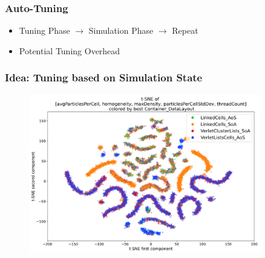 \documentclass[
	10pt,
	t		%
]{beamer}
\begin{document}
\begin{frame}
	\frametitle{Auto-Tuning }
	
	\begin{itemize}
		\item Tuning Phase $\rightarrow$ Simulation Phase $\rightarrow$ Repeat
		\item Potential Tuning Overhead
	\end{itemize}
	
	\vspace{0.1cm}
	
	\begin{figure}
	\end{figure}
	
	
\end{frame}

\begin{frame}
	\frametitle{Idea: Tuning based on Simulation State}
	
	\vspace{-0.4cm}
	
	\begin{figure}
		\centering
		\includegraphics[width=0.9\textwidth,trim={0 0 0 0cm},clip]{figures/t-SNE_Container_DataLayout_filtered.png}
	\end{figure}
	
\end{frame}
\end{document}
